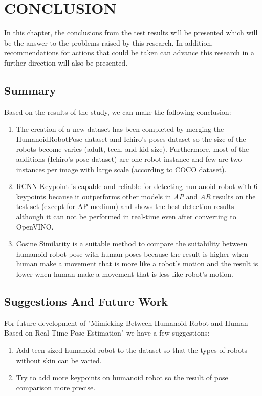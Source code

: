 \chapter{CONCLUSION}
\label{chap:conclusion}

In this chapter, the conclusions from the test results will be presented which will be the answer to the problems raised by this research.
In addition, recommendations for actions that could be taken can advance this research in a further direction will also be presented.

\section{Summary}
\label{sec:summary}

Based on the results of the study, we can make the following conclusion:

\begin{enumerate}[nolistsep]

  \item The creation of a new dataset has been completed by merging the HumanoidRobotPose dataset and Ichiro's poses dataset 
        so the size of the robots become varies (adult, teen, and kid size). Furthermore, most of the additions (Ichiro's pose dataset) are one robot instance and
        few are two instances per image with large scale (according to COCO dataset).
  \item RCNN Keypoint is capable and reliable for detecting humanoid robot with 6 keypoints because it outperforms other models in \emph{AP} and \emph{AR} results on the test set (except for AP medium)
        and shows the best detection results although it can not be performed in real-time even after converting to OpenVINO.
  \item Cosine Similarity is a suitable method to compare the suitability between humanoid robot pose with human poses because the result is higher when
        human make a movement that is more like a robot's motion and the result is lower when human make a movement that is less like robot's motion.

\end{enumerate}

\section{Suggestions And Future Work}
\label{chap:suggestionsandfuturework}

For future development of "Mimicking Between Humanoid Robot and Human Based on Real-Time Pose Estimation" we have a few suggestions:

\begin{enumerate}[nolistsep]

  \item Add teen-sized humanoid robot to the dataset so that the types of robots without skin can be varied.
  \item Try to add more keypoints on humanoid robot so the result of pose comparison more precise.

\end{enumerate}
